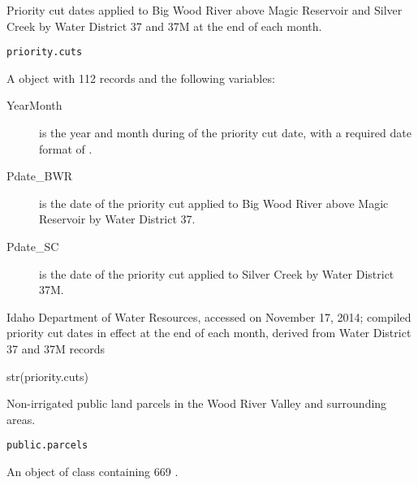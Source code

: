 \documentclass[letterpaper]{book}
\begin{document}
%
\begin{Description}\relax
Priority cut dates applied to Big Wood River above Magic Reservoir and Silver Creek by Water District 37 and 37M at the end of each month.
\end{Description}
%
\begin{Usage}
\begin{verbatim}
priority.cuts
\end{verbatim}
\end{Usage}
%
\begin{Format}
A  object with 112 records and the following variables:
\begin{description}

\item[YearMonth] is the year and month during of the priority cut date, with a required date format of .
\item[Pdate\_BWR] is the date of the priority cut applied to Big Wood River above Magic Reservoir by Water District 37.
\item[Pdate\_SC] is the date of the priority cut applied to Silver Creek by Water District 37M.

\end{description}

\end{Format}
%
\begin{Source}\relax
Idaho Department of Water Resources, accessed on November 17, 2014;
compiled priority cut dates in effect at the end of each month, derived from Water District 37 and 37M records
\end{Source}
%
\begin{Examples}
\begin{ExampleCode}
str(priority.cuts)
\end{ExampleCode}
\end{Examples}
%
\begin{Description}\relax
Non-irrigated public land parcels in the Wood River Valley and surrounding areas.
\end{Description}
%
\begin{Usage}
\begin{verbatim}
public.parcels
\end{verbatim}
\end{Usage}
%
\begin{Format}
An object of  class containing 669 .
\end{Format}
\end{document}
